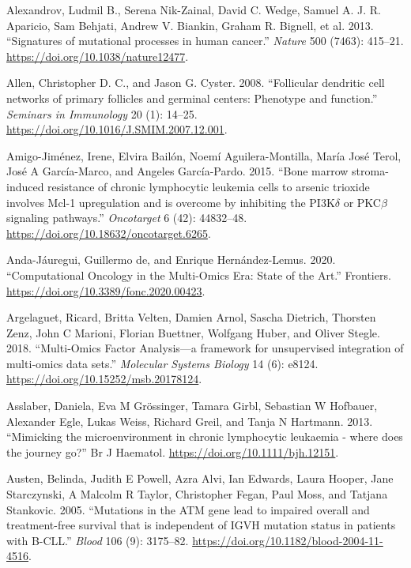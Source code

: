 \documentclass[11pt, a4paper, twosided]{book}
\newenvironment{CSLReferences}%
  {}%
  {\par}
\begin{document}
\begin{CSLReferences}{1}{0}
\leavevmode{}%
Alexandrov, Ludmil B., Serena Nik-Zainal, David C. Wedge, Samuel A. J. R. Aparicio, Sam Behjati, Andrew V. Biankin, Graham R. Bignell, et al. 2013. {``{Signatures of mutational processes in human cancer}.''} \emph{Nature} 500 (7463): 415--21. \url{https://doi.org/10.1038/nature12477}.

\leavevmode{}%
Allen, Christopher D. C., and Jason G. Cyster. 2008. {``{Follicular dendritic cell networks of primary follicles and germinal centers: Phenotype and function}.''} \emph{Seminars in Immunology} 20 (1): 14--25. \url{https://doi.org/10.1016/J.SMIM.2007.12.001}.

\leavevmode{}%
Amigo-Jiménez, Irene, Elvira Bailón, Noemí Aguilera-Montilla, María José Terol, José A García-Marco, and Angeles García-Pardo. 2015. {``{Bone marrow stroma-induced resistance of chronic lymphocytic leukemia cells to arsenic trioxide involves Mcl-1 upregulation and is overcome by inhibiting the PI3K\(\delta\) or PKC\(\beta\) signaling pathways}.''} \emph{Oncotarget} 6 (42): 44832--48. \url{https://doi.org/10.18632/oncotarget.6265}.

\leavevmode{}%
Anda-Jáuregui, Guillermo de, and Enrique Hernández-Lemus. 2020. {``{Computational Oncology in the Multi-Omics Era: State of the Art}.''} Frontiers. \url{https://doi.org/10.3389/fonc.2020.00423}.

\leavevmode{}%
Argelaguet, Ricard, Britta Velten, Damien Arnol, Sascha Dietrich, Thorsten Zenz, John C Marioni, Florian Buettner, Wolfgang Huber, and Oliver Stegle. 2018. {``{Multi‐Omics Factor Analysis---a framework for unsupervised integration of multi‐omics data sets}.''} \emph{Molecular Systems Biology} 14 (6): e8124. \url{https://doi.org/10.15252/msb.20178124}.

\leavevmode{}%
Asslaber, Daniela, Eva M Grössinger, Tamara Girbl, Sebastian W Hofbauer, Alexander Egle, Lukas Weiss, Richard Greil, and Tanja N Hartmann. 2013. {``{Mimicking the microenvironment in chronic lymphocytic leukaemia - where does the journey go?}''} Br J Haematol. \url{https://doi.org/10.1111/bjh.12151}.

\leavevmode{}%
Austen, Belinda, Judith E Powell, Azra Alvi, Ian Edwards, Laura Hooper, Jane Starczynski, A Malcolm R Taylor, Christopher Fegan, Paul Moss, and Tatjana Stankovic. 2005. {``{Mutations in the ATM gene lead to impaired overall and treatment-free survival that is independent of IGVH mutation status in patients with B-CLL}.''} \emph{Blood} 106 (9): 3175--82. \url{https://doi.org/10.1182/blood-2004-11-4516}.


\end{CSLReferences}
\end{document}
